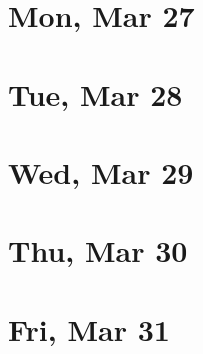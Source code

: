 	\section{Mon, Mar 27}
		
		
	\section{Tue, Mar 28}
		
		
	\section{Wed, Mar 29}
		
		
	\section{Thu, Mar 30}
		
		
	\section{Fri, Mar 31}
		
		
